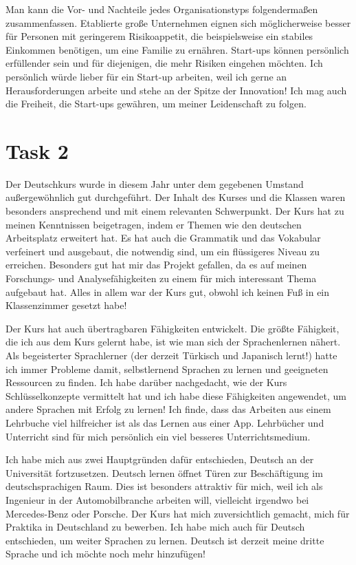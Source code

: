 \documentclass[11pt]{article}
\numberwithin{equation}{section}
\begin{document}
Man kann die Vor- und Nachteile jedes Organisationstyps folgendermaßen zusammenfassen. Etablierte große Unternehmen eignen sich möglicherweise besser für Personen mit geringerem Risikoappetit, die beispielsweise ein stabiles Einkommen benötigen, um eine Familie zu ernähren. Start-ups können persönlich erfüllender sein und für diejenigen, die mehr Risiken eingehen möchten. Ich persönlich würde lieber für ein Start-up arbeiten, weil ich gerne an Herausforderungen arbeite und stehe an der Spitze der Innovation! Ich mag auch die Freiheit, die Start-ups gewähren, um meiner Leidenschaft zu folgen.
\newpage
\section*{Task 2}
Der Deutschkurs wurde in diesem Jahr unter dem gegebenen Umstand außergewöhnlich gut durchgeführt. Der Inhalt des Kurses und die Klassen waren besonders ansprechend und mit einem relevanten Schwerpunkt. Der Kurs hat zu meinen Kenntnissen beigetragen, indem er Themen wie den deutschen Arbeitsplatz erweitert hat. Es hat auch die Grammatik und das Vokabular verfeinert und ausgebaut, die notwendig sind, um ein flüssigeres Niveau zu erreichen. Besonders gut hat mir das Projekt gefallen, da es auf meinen Forschungs- und Analysefähigkeiten zu einem für mich interessant Thema aufgebaut hat. Alles in allem war der Kurs gut, obwohl ich keinen Fuß in ein Klassenzimmer gesetzt habe!

Der Kurs hat auch übertragbaren Fähigkeiten entwickelt. Die größte Fähigkeit, die ich aus dem Kurs gelernt habe, ist wie man sich der Sprachenlernen nähert. Als begeisterter Sprachlerner (der derzeit Türkisch und Japanisch lernt!) hatte ich immer Probleme damit, selbstlernend Sprachen zu lernen und geeigneten Ressourcen zu finden. Ich habe darüber nachgedacht, wie der Kurs Schlüsselkonzepte vermittelt hat und ich habe diese Fähigkeiten angewendet, um andere Sprachen mit Erfolg zu lernen! Ich finde, dass das Arbeiten aus einem Lehrbuche viel hilfreicher ist als das Lernen aus einer App. Lehrbücher und Unterricht sind für mich persönlich ein viel besseres Unterrichtsmedium.

Ich habe mich aus zwei Hauptgründen dafür entschieden, Deutsch an der Universität fortzusetzen. Deutsch lernen öffnet Türen zur Beschäftigung im deutschsprachigen Raum. Dies ist besonders attraktiv für mich, weil ich als Ingenieur in der Automobilbranche arbeiten will, vielleicht irgendwo bei Mercedes-Benz oder Porsche. Der Kurs hat mich zuversichtlich gemacht, mich für Praktika in Deutschland zu bewerben. Ich habe mich auch für Deutsch entschieden, um weiter Sprachen zu lernen. Deutsch ist derzeit meine dritte Sprache und ich möchte noch mehr hinzufügen! 
\end{document}
